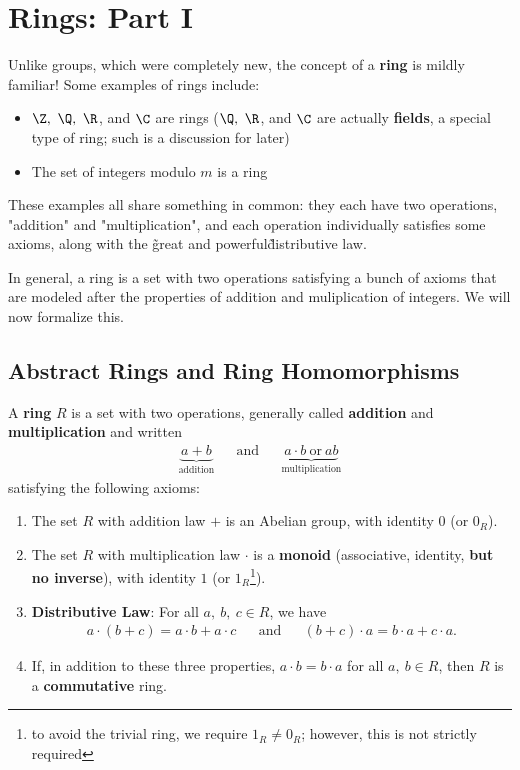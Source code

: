 \documentclass[math1530-lecture-notes]{subfiles}
\begin{document}
\chapter{Rings: Part I}

Unlike groups, which were completely new, the concept of a \textbf{ring} is mildly familiar! Some
examples of rings include:
\begin{itemize}
  \item $\Z,\ \Q,\ \R$, and $\C$ are rings ($\Q,\ \R$, and $\C$ are actually \textbf{fields}, a
    special type of ring; such is a discussion for later)
  \item The set of integers modulo $m$ is a ring
\end{itemize}

These examples all share something in common: they each have two operations, "addition" and
"multiplication", and each operation individually satisfies some axioms, along with the \~great and
powerful\~ distributive law.

In general, a ring is a set with two operations satisfying a bunch of axioms that are modeled after
the properties of addition and muliplication of integers. We will now formalize this.

\section{Abstract Rings and Ring Homomorphisms}

\begin{definition}[Rings]{}
  A \textbf{ring} $R$ is a set with two operations, generally called \textbf{addition} and
  \textbf{multiplication} and written
  \begin{align*}
    \underbrace{a+b}_{\text{addition}} &&\text{and}&& \underbrace{a\cdot b
    ~\text{or}~ab}_{\text{multiplication}}
  \end{align*}
  satisfying the following axioms:
  \begin{enumerate}
    \item The set $R$ with addition law $+$ is an Abelian group, with identity $0$ (or $0_R$).
    \item The set $R$ with multiplication law $\cdot $ is a \textbf{monoid} (associative, identity,
      \textbf{but no inverse}), with identity $1$ (or $1_R$\footnote{to avoid the trivial ring, we
      require $1_R\neq 0_R$; however, this is not strictly required}).
    \item \textbf{Distributive Law}: For all $a,\ b,\ c\in R$, we have
      \begin{align*}
        a\cdot (b+c)=a\cdot b+a\cdot c && \text{and} && (b+c)\cdot a= b\cdot a+c\cdot a
      .\end{align*}
    \item If, in addition to these three properties, $a\cdot b=b\cdot a$ for all $a,\ b\in R$, then
      $R$ is a \textbf{commutative} ring.
  \end{enumerate}
\end{definition}
\end{document}
